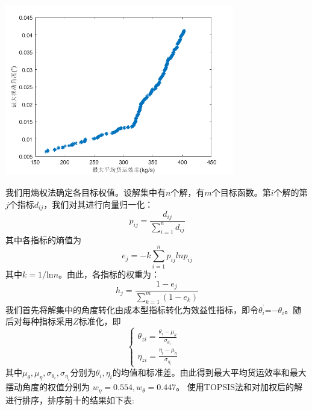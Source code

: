 \documentclass[withoutpreface,bwprint]{cumcmthesis} %
\begin{document}
\centerline{\includegraphics[width=10cm]{p3demo.png}}

我们用熵权法确定各目标权值。设解集中有$n$个解，有$m$个目标函数。第$i$个解的第$j$个指标$d_{ij}$，我们对其进行向量归一化：
$$p_{ij}=\frac{d_{ij}}{\sum_{i=1}^{n}d_{ij}}$$
其中各指标的熵值为
$$e_j=-k\sum_{i=1}^{n}p_{ij}lnp_{ij}$$
其中$k=1/$ln$n$。由此，各指标的权重为：
$$h_j=\frac{1-e_j}{\sum_{k=1}^{m}(1-e_k)}$$
我们首先将解集中的角度转化由成本型指标转化为效益性指标，即令$\theta_i^’$=$-\theta_i$。随后对每种指标采用$Z$标准化，即
$$\left\{\begin{matrix}
 \theta_{zi}=\frac{\theta_i-\mu _\theta}{\sigma _{\theta_i}}&\\
 \eta _{zi}=\frac{\eta_i-\mu _\eta}{\sigma _{\eta_i}}& 
\end{matrix}\right.$$
其中$\mu _\theta,\mu _\eta,\sigma _{\theta_i},\sigma _{\eta_i}$分别为$\theta_i,\eta_i$的均值和标准差。由此得到最大平均货运效率和最大摆动角度的权值分别为
$w_\eta=0.554,w_\theta=0.447$。
使用TOPSIS法和对加权后的解进行排序，排序前十的结果如下表:
\end{document}

